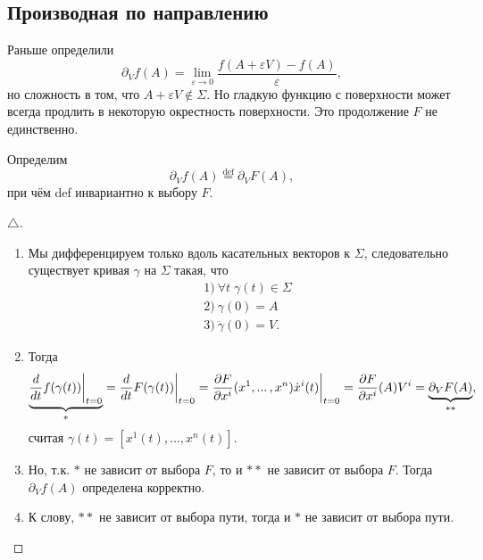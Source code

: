 \subsection{Производная по направлению}

Раньше определили
$$
    \partial_V f(A) = \lim_{\varepsilon \to 0} \frac{f(A + \varepsilon V) - f(A)}{\varepsilon},
$$
но сложность в том, что $A + \varepsilon V \notin \Sigma$. 
Но гладкую функцию с поверхности может всегда продлить в некоторую окрестность поверхности. Это продолжение $F$ не единственно. 

\begin{to_def} 
    Определим
    $$
         \partial_V f(A) \overset{\mathrm{def}}{=} \partial_V F(A),
    $$ 
    при чём def инвариантно к выбору $F$.
\end{to_def}

\begin{proof}[$\triangle$]
    \begin{minipage}[t]{0.9\textwidth}
        \begin{enumerate}[label = \Roman*.]
            \item Мы дифференцируем только вдоль касательных векторов к $\Sigma$, следовательно существует кривая $\gamma$ на $\Sigma$ такая, что
            \begin{align*}
                &1) \ \forall t \; \gamma(t) \in \Sigma \\
                &2) \ \gamma(0) = A \\
                &3) \ \ddot{\gamma}(0) = V.
            \end{align*}
            \item Тогда
            $$
                \underbrace{\frac{d}{dt} f(\gamma(t)) \bigg|_{t=0}}_{
                *
                } = 
                \frac{d}{dt} F(\gamma(t)) \bigg|_{t=0} =
                \frac{\partial F}{\partial x^i} ({x}^{1}, ... \,, {x}^{n}) \dot{x}^i (t) \bigg|_{t=0} =
                \frac{\partial F}{\partial x^i} (A) V^i = 
                \underbrace{\partial_V F(A)}_{
                **
                }
                ,
            $$
            считая $\gamma(t) = [x^1(t),\ldots, x^n(t)]$.
            \item Но, т.к. $*$ не зависит от выбора $F$, то и $**$ не зависит от выбора $F$. Тогда $\partial_V f(A)$ определена корректно.
            \item К слову, $**$ не зависит от выбора пути, тогда и $*$ не зависит от выбора пути.
        \end{enumerate}
    \end{minipage}

\phantom{42}
\end{proof}

